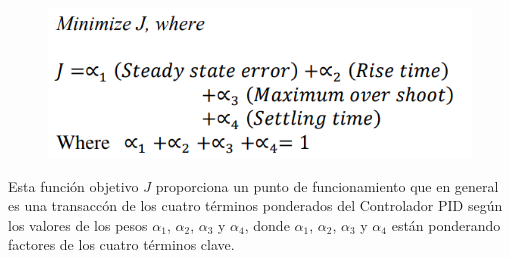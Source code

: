 \begin{figure}[th]
    \centering
    \includegraphics[width=.7\textwidth]{Figures/demo1.png}
    \label{fig:demo}
\end{figure}

Esta funci\'on objetivo $J$ proporciona un punto de funcionamiento que
en general es una transacc\'on de los cuatro t\'erminos ponderados del
Controlador \textsc{PID} seg\'un los valores de los pesos $\alpha_1$,
$\alpha_2$, $\alpha_3$ y $\alpha_4$, donde $\alpha_1$, $\alpha_2$, $\alpha_3$ y
$\alpha_4$ est\'an ponderando
factores de los cuatro t\'erminos clave. \parencite{pid}
